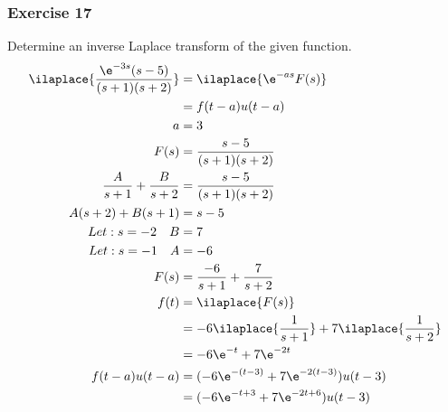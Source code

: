 \documentclass{math}
\begin{document}
\subsubsection*{Exercise 17}
Determine an inverse Laplace transform of the given function.
\begin{align*}
  \ilaplace{\frac{\e^{-3s}(s-5)}{(s+1)(s+2)}} &= \ilaplace{\e^{-as}F(s)} \\
  &= f(t-a)u(t-a) \\
  a &= 3 \\
  F(s) &= \frac{s-5}{(s+1)(s+2)} \\
  \frac{A}{s+1}+\frac{B}{s+2} &= \frac{s-5}{(s+1)(s+2)} \\
  A(s+2)+B(s+1) &= s-5 \\
  Let: s = -2 \quad B &= 7 \\
  Let: s = -1 \quad A &= -6 \\
  F(s) &= \frac{-6}{s+1}+\frac{7}{s+2} \\
  f(t) &= \ilaplace{F(s)} \\
  &= -6\ilaplace{\frac{1}{s+1}}+7\ilaplace{\frac{1}{s+2}} \\
  &= -6\e^{-t}+7\e^{-2t} \\
  f(t-a)u(t-a) &= (-6\e^{-(t-3)}+7\e^{-2(t-3)})u(t-3) \\
  &= (-6\e^{-t+3}+7\e^{-2t+6})u(t-3)
\end{align*}
\end{document}
